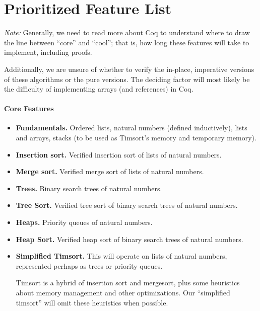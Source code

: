 \documentclass{article}
\begin{document}


\section{Prioritized Feature List}
\emph{Note:} Generally, we need to read more about Coq to understand
where to draw the line between ``core'' and ``cool''; that is, how long
these features will take to implement, including proofs.

Additionally, we are unsure of whether to verify the in-place,
imperative versions of these algorithms or the pure versions.
The deciding factor will most likely be the difficulty of implementing
arrays (and references) in Coq.

\paragraph{Core Features}
\begin{itemize}
  \item \textbf{Fundamentals.}
    Ordered lists, natural numbers (defined inductively), lists and arrays,
    stacks (to be used as Timsort's memory and temporary memory).
  \item \textbf{Insertion sort.}
    Verified insertion sort of lists of natural numbers.
  \item \textbf{Merge sort.}
    Verified merge sort of lists of natural numbers.
  \item \textbf{Trees.}
    Binary search trees of natural numbers.
  \item \textbf{Tree Sort.}
    Verified tree sort of
    binary search trees of natural numbers.
  \item \textbf{Heaps.}
    Priority queues of natural numbers.
  \item \textbf{Heap Sort.}
    Verified heap sort of
    binary search trees of natural numbers.
  \item \textbf{Simplified Timsort.}
    This will operate on lists of natural numbers, represented perhaps
    as trees or priority queues.

    Timsort is a hybrid of insertion sort and mergesort, plus some heuristics
    about memory management and other optimizations. Our ``simplified
    timsort'' will omit these heuristics when possible.
\end{itemize}
\end{document}
